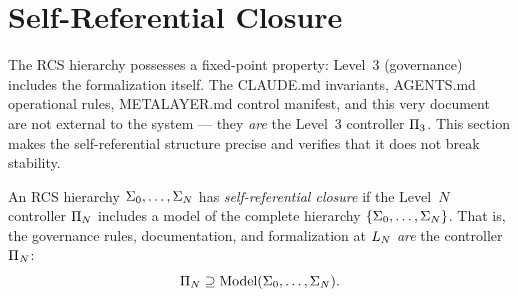 \documentclass[11pt,a4paper]{article}
\begin{document}
\section{Self-Referential Closure}
\label{sec:closure}

The RCS hierarchy possesses a fixed-point property: Level~3 (governance) includes
the formalization itself.  The CLAUDE.md invariants, AGENTS.md operational rules,
METALAYER.md control manifest, and this very document are not external to the
system --- they \emph{are} the Level~3 controller $\Pi_3$.  This section makes
the self-referential structure precise and verifies that it does not break
stability.

\begin{definition}
\label{def:self-ref}
An RCS hierarchy $\Sigma_0, \ldots, \Sigma_N$ has \emph{self-referential closure}
if the Level~$N$ controller $\Pi_N$ includes a model of the complete hierarchy
$\{\Sigma_0, \ldots, \Sigma_N\}$.  That is, the governance rules, documentation,
and formalization at $L_{N}$ \emph{are} the controller $\Pi_N$:
\begin{equation}
  \Pi_N \supseteq \text{Model}(\Sigma_0, \ldots, \Sigma_N).
\end{equation}
\end{definition}
\end{document}
